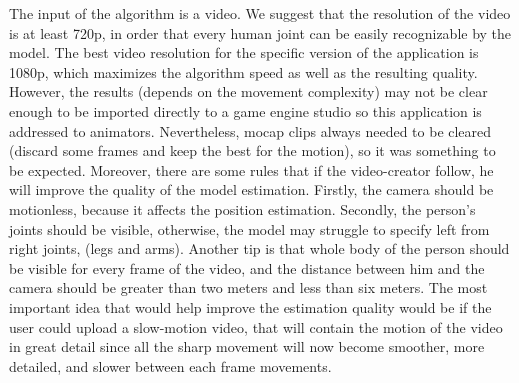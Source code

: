 The input of the algorithm is a video. We suggest that the resolution of the video is at least 720p, in order that every human joint can be easily recognizable by the model. The best video resolution for the specific version of the application is 1080p, which maximizes the algorithm speed as well as the resulting quality. However, the results (depends on the movement complexity) may not be clear enough to be imported directly to a game engine studio so this application is addressed to animators. Nevertheless, mocap clips always needed to be cleared (discard some frames and keep the best for the motion), so it was something to be expected. Moreover, there are some rules that if the video-creator follow, he will improve the quality of the model estimation. Firstly, the camera should be motionless, because it affects the position estimation. Secondly, the person's joints should be visible, otherwise, the model may struggle to specify left from right joints, (legs and arms). Another tip is that whole body of the person should be visible for every frame of the video, and the distance between him and the camera should be greater than two meters and less than six meters. The most important idea that would help improve the estimation quality would be if the user could upload a slow-motion video, that will contain the motion of the video in great detail since all the sharp movement will now become smoother, more detailed, and slower between each frame movements.
\pagebreak